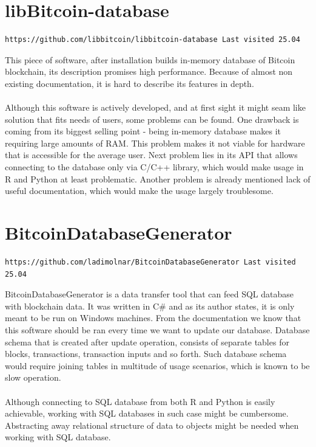 \documentclass[12pt, en, eng, oneside]{mgr}
\begin{document}
\section{libBitcoin-database}

\begin{verbatim}
https://github.com/libbitcoin/libbitcoin-database Last visited 25.04
\end{verbatim}

This piece of software, after installation builds in-memory database of Bitcoin blockchain, its description promises high performance. Because of almost non existing documentation, it is hard to describe its features in depth.
\\
\\
Although this software is actively developed, and at first sight it might seam like solution that fits needs of users, some problems can be found. One drawback is coming from its biggest selling point - being in-memory database makes it requiring large amounts of RAM. This problem makes it not viable for hardware that is accessible for the average user. Next problem lies in its API that allows connecting to the database only via C/C++ library, which would make usage in R and Python at least problematic. Another problem is already mentioned lack of useful documentation, which would make the usage largely troublesome.

\section{BitcoinDatabaseGenerator}

\begin{verbatim}
https://github.com/ladimolnar/BitcoinDatabaseGenerator Last visited 25.04
\end{verbatim}

BitcoinDatabaseGenerator is a data transfer tool that can feed SQL database with blockchain data. It was written in C\# and as its author states, it is only meant to be run on Windows machines. From the documentation we know that this software should be ran every time we want to update our database. Database schema that is created after update operation, consists of separate tables for blocks, transactions, transaction inputs and so forth. Such database schema would require joining tables in multitude of usage scenarios, which is known to be slow operation.
\\
\\
Although connecting to SQL database from both R and Python is easily achievable, working with SQL databases in such case might be cumbersome. Abstracting away relational structure of data to objects might be needed when working with SQL database. 
\end{document}
